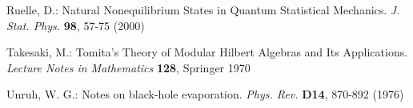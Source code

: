 \documentclass[a4paper,11pt]{article}
\begin{document}
\begin{thebibliography}{*****}

 Ruelle, D.: Natural Nonequilibrium States in Quantum
Statistical Mechanics. {\it J. Stat. Phys. } {\bf 98}, 57-75 (2000)




 Takesaki, M.: Tomita's Theory of Modular Hilbert Algebras
and Its Applications. {\it Lecture Notes in Mathematics} {\bf 128}, Springer 1970


 Unruh, W. G.: Notes on black-hole evaporation. {\it Phys. Rev.}
{\bf D14}, 870-892 (1976)


\end{thebibliography}
\end{document}
